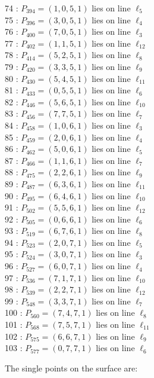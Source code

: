 \documentclass{article}
\begin{document}
{\begin{multicols}{2}
74 : $P_{394}=( 1, 0, 5, 1 )$ lies on line $\ell_{5}$\\
75 : $P_{396}=( 3, 0, 5, 1 )$ lies on line $\ell_{4}$\\
76 : $P_{400}=( 7, 0, 5, 1 )$ lies on line $\ell_{3}$\\
77 : $P_{402}=( 1, 1, 5, 1 )$ lies on line $\ell_{12}$\\
78 : $P_{414}=( 5, 2, 5, 1 )$ lies on line $\ell_{8}$\\
79 : $P_{420}=( 3, 3, 5, 1 )$ lies on line $\ell_{9}$\\
80 : $P_{430}=( 5, 4, 5, 1 )$ lies on line $\ell_{11}$\\
81 : $P_{433}=( 0, 5, 5, 1 )$ lies on line $\ell_{6}$\\
82 : $P_{446}=( 5, 6, 5, 1 )$ lies on line $\ell_{10}$\\
83 : $P_{456}=( 7, 7, 5, 1 )$ lies on line $\ell_{7}$\\
84 : $P_{458}=( 1, 0, 6, 1 )$ lies on line $\ell_{3}$\\
85 : $P_{459}=( 2, 0, 6, 1 )$ lies on line $\ell_{4}$\\
86 : $P_{462}=( 5, 0, 6, 1 )$ lies on line $\ell_{5}$\\
87 : $P_{466}=( 1, 1, 6, 1 )$ lies on line $\ell_{7}$\\
88 : $P_{475}=( 2, 2, 6, 1 )$ lies on line $\ell_{9}$\\
89 : $P_{487}=( 6, 3, 6, 1 )$ lies on line $\ell_{11}$\\
90 : $P_{495}=( 6, 4, 6, 1 )$ lies on line $\ell_{10}$\\
91 : $P_{502}=( 5, 5, 6, 1 )$ lies on line $\ell_{12}$\\
92 : $P_{505}=( 0, 6, 6, 1 )$ lies on line $\ell_{6}$\\
93 : $P_{519}=( 6, 7, 6, 1 )$ lies on line $\ell_{8}$\\
94 : $P_{523}=( 2, 0, 7, 1 )$ lies on line $\ell_{5}$\\
95 : $P_{524}=( 3, 0, 7, 1 )$ lies on line $\ell_{3}$\\
96 : $P_{527}=( 6, 0, 7, 1 )$ lies on line $\ell_{4}$\\
97 : $P_{536}=( 7, 1, 7, 1 )$ lies on line $\ell_{10}$\\
98 : $P_{539}=( 2, 2, 7, 1 )$ lies on line $\ell_{12}$\\
99 : $P_{548}=( 3, 3, 7, 1 )$ lies on line $\ell_{7}$\\
100 : $P_{560}=( 7, 4, 7, 1 )$ lies on line $\ell_{8}$\\
101 : $P_{568}=( 7, 5, 7, 1 )$ lies on line $\ell_{11}$\\
102 : $P_{575}=( 6, 6, 7, 1 )$ lies on line $\ell_{9}$\\
103 : $P_{577}=( 0, 7, 7, 1 )$ lies on line $\ell_{6}$\\
\end{multicols}
The single points on the surface are:\\
}
\end{document}
